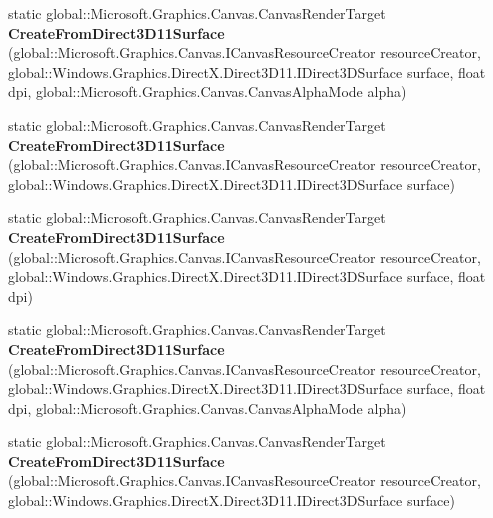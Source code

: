\begin{DoxyCompactItemize}
static global\+::\+Microsoft.\+Graphics.\+Canvas.\+Canvas\+Render\+Target {\bfseries Create\+From\+Direct3\+D11\+Surface} (global\+::\+Microsoft.\+Graphics.\+Canvas.\+I\+Canvas\+Resource\+Creator resource\+Creator, global\+::\+Windows.\+Graphics.\+Direct\+X.\+Direct3\+D11.\+I\+Direct3\+D\+Surface surface, float dpi, global\+::\+Microsoft.\+Graphics.\+Canvas.\+Canvas\+Alpha\+Mode alpha)
\item 
\mbox{\label{class_microsoft_1_1_graphics_1_1_canvas_1_1_canvas_render_target_a6214c61bb128a65a41a783600e00335a}} 
static global\+::\+Microsoft.\+Graphics.\+Canvas.\+Canvas\+Render\+Target {\bfseries Create\+From\+Direct3\+D11\+Surface} (global\+::\+Microsoft.\+Graphics.\+Canvas.\+I\+Canvas\+Resource\+Creator resource\+Creator, global\+::\+Windows.\+Graphics.\+Direct\+X.\+Direct3\+D11.\+I\+Direct3\+D\+Surface surface)
\item 
\mbox{\label{class_microsoft_1_1_graphics_1_1_canvas_1_1_canvas_render_target_a3aab21df283c755cb1bc43211916da41}} 
static global\+::\+Microsoft.\+Graphics.\+Canvas.\+Canvas\+Render\+Target {\bfseries Create\+From\+Direct3\+D11\+Surface} (global\+::\+Microsoft.\+Graphics.\+Canvas.\+I\+Canvas\+Resource\+Creator resource\+Creator, global\+::\+Windows.\+Graphics.\+Direct\+X.\+Direct3\+D11.\+I\+Direct3\+D\+Surface surface, float dpi)
\item 
\mbox{\label{class_microsoft_1_1_graphics_1_1_canvas_1_1_canvas_render_target_aaa9628136a19a0737f5229fbb9c84e55}} 
static global\+::\+Microsoft.\+Graphics.\+Canvas.\+Canvas\+Render\+Target {\bfseries Create\+From\+Direct3\+D11\+Surface} (global\+::\+Microsoft.\+Graphics.\+Canvas.\+I\+Canvas\+Resource\+Creator resource\+Creator, global\+::\+Windows.\+Graphics.\+Direct\+X.\+Direct3\+D11.\+I\+Direct3\+D\+Surface surface, float dpi, global\+::\+Microsoft.\+Graphics.\+Canvas.\+Canvas\+Alpha\+Mode alpha)
\item 
\mbox{\label{class_microsoft_1_1_graphics_1_1_canvas_1_1_canvas_render_target_a6214c61bb128a65a41a783600e00335a}} 
static global\+::\+Microsoft.\+Graphics.\+Canvas.\+Canvas\+Render\+Target {\bfseries Create\+From\+Direct3\+D11\+Surface} (global\+::\+Microsoft.\+Graphics.\+Canvas.\+I\+Canvas\+Resource\+Creator resource\+Creator, global\+::\+Windows.\+Graphics.\+Direct\+X.\+Direct3\+D11.\+I\+Direct3\+D\+Surface surface)

\end{DoxyCompactItemize}
